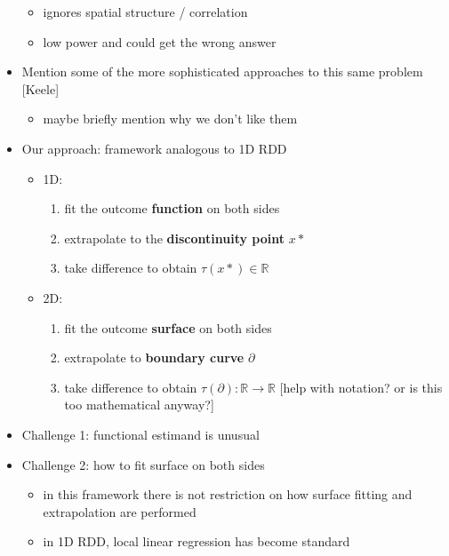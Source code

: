 \documentclass[letter]{article}
\providecommand{\tightlist}{%
      \setlength{\itemsep}{0pt}\setlength{\parskip}{0pt}}
\newcommand{\boundary}{\partial}
\providecommand{\tightlist}{%
  	  \setlength{\itemsep}{0pt}\setlength{\parskip}{0pt}}
\begin{document}
\begin{itemize}
  \begin{itemize}
  \tightlist
  \item
    ignores spatial structure / correlation
  \item
    low power and could get the wrong answer
  \end{itemize}
\item
  Mention some of the more sophisticated approaches to this same problem
  {[}Keele{]}

  \begin{itemize}
  \tightlist
  \item
    maybe briefly mention why we don't like them
  \end{itemize}
\item
  Our approach: framework analogous to 1D RDD

  \begin{itemize}
  \tightlist
  \item
    1D:

    \begin{enumerate}
    \def\labelenumi{\arabic{enumi}.}
    \tightlist
    \item
      fit the outcome \textbf{function} on both sides
    \item
      extrapolate to the \textbf{discontinuity point} \(x*\)
    \item
      take difference to obtain \(\tau(x*) \in \mathbb{R}\)
    \end{enumerate}
  \item
    2D:

    \begin{enumerate}
    \def\labelenumi{\arabic{enumi}.}
    \tightlist
    \item
      fit the outcome \textbf{surface} on both sides
    \item
      extrapolate to \textbf{boundary curve} \(\boundary\)
    \item
      take difference to obtain
      \(\tau(\boundary): \mathbb{R} \rightarrow \mathbb{R}\) {[}help
      with notation? or is this too mathematical anyway?{]}
    \end{enumerate}
  \end{itemize}
\item
  Challenge 1: functional estimand is unusual
\item
  Challenge 2: how to fit surface on both sides

  \begin{itemize}
  \tightlist
  \item
    in this framework there is not restriction on how surface fitting
    and extrapolation are performed
  \item
    in 1D RDD, local linear regression has become standard


\end{itemize}
\end{itemize}
\end{document}
